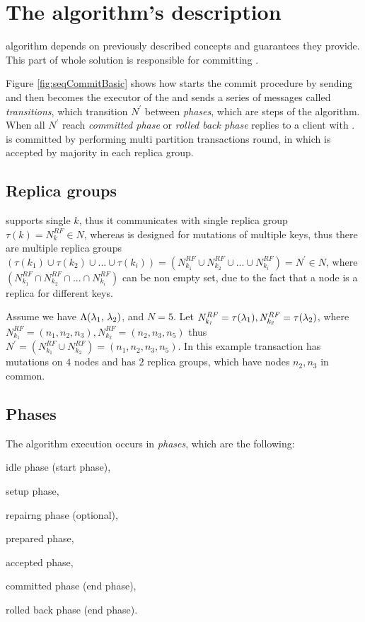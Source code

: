 
\section{The algorithm's description}
\mpt algorithm depends on previously described \paxos concepts and guarantees they provide. 
This part of whole solution is responsible for committing \transaction. 

Figure \ref{fig:seqCommitBasic} shows how \client starts the commit procedure by sending \txCommitMessage and then  becomes the executor of the \transaction and sends a series of messages called \emph{transitions}, which transition $\mathit{N}^'$ between \emph{phases}, which are steps of the algorithm. When all $\mathit{N}^'$ reach \emph{committed phase} or \emph{rolled back phase}  replies to a client with \txCommitResonseMessage.  \transaction is committed by performing multi partition transactions \paxos round, 
in which \txState is accepted by majority in each replica group.



\subsection{Replica groups}
\label{sec:mpp:replicaGroups}
\lwt supports single $k$, thus it communicates with single replica group $\tau(k) = N^{RF}_{k} \in \mathit{N}$, whereas \mpt is designed for mutations of multiple keys, thus there are multiple replica groups 
$(\tau(k_1) \cup \tau(k_2) \cup ... \cup \tau(k_i) ) = (N^{RF}_{k_1} \cup N^{RF}_{k_2} \cup ... \cup N^{RF}_{k_i} ) = \mathit{N^'} \in \mathit{N}$, where $(N^{RF}_{k_1} \cap N^{RF}_{k_2} \cap ... \cap N^{RF}_{k_i})$ can be non empty set, due to the fact that a node is a replica for different keys.

Assume we have $\text{$\Lambda$}(\text{$\lambda_{1}$, $\lambda_{2}$})$,  and $N=5$. Let $\mathit{N^{RF}_{k_1}} = \tau(\text{$\lambda_{1}$}), \mathit{N^{RF}_{k_2}} = \tau(\text{$\lambda_{2}$})$, where $\mathit{N^{RF}_{k_1}} = (n_1,n_2,n_3), \mathit{N^{RF}_{k_2}} = (n_2,n_3,n_5)$ thus $\mathit{N}^' = (N^{RF}_{k_1} \cup N^{RF}_{k_2}) = (n_1, n_2, n_3, n_5)$.
In this example transaction has mutations on $4$ nodes and has
$2$ replica groups, which have nodes $n_2, n_3$ in common.  


\subsection{Phases}
The algorithm execution occurs in \emph{phases}, which are the following: 
\begin{enumerate*}[label=\alph*)]
\item idle phase (start phase),
\item setup phase,
\item repairng phase (optional),
\item prepared phase,
\item accepted phase,
\item committed phase (end phase),
\item rolled back phase (end phase).
\end{enumerate*}

